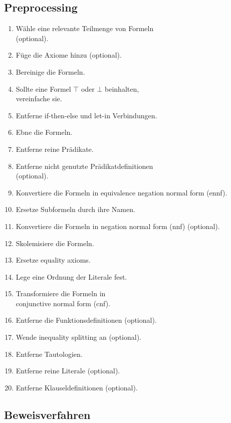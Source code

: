 \documentclass{acm_proc_article-sp-german}
\begin{document}
\subsection{Preprocessing}
\label{subsec:preprocessing}
\begin{enumerate}
	\item Wähle eine relevante Teilmenge von Formeln \\(optional).
	\item Füge die Axiome hinzu (optional).
	\item Bereinige die Formeln.
	\item Sollte eine Formel $\top$ oder $\bot$ beinhalten, \\vereinfache sie.
	\item Entferne if-then-else und let-in Verbindungen.
	\item Ebne die Formeln.
	\item Entferne reine Prädikate.
	\item Entferne nicht genutzte Prädikatdefinitionen \\(optional).
	\item Konvertiere die Formeln in equivalence negation normal form (ennf).
	\item Ersetze Subformeln durch ihre Namen.
	\item Konvertiere die Formeln in negation normal form (nnf) (optional).
	\item Skolemisiere die Formeln.
	\item Ersetze equality axioms.
	\item Lege eine Ordnung der Literale fest.
	\item Transformiere die Formeln in \\conjunctive normal form (cnf).
	\item Entferne die Funktionsdefinitionen (optional).
	\item Wende inequality splitting an (optional).
	\item Entferne Tautologien.
	\item Entferne reine Literale (optional).
	\item Entferne Klauseldefinitionen (optional).
\end{enumerate}





\subsection{Beweisverfahren}
\label{subsec:proofmech}
\end{document}
